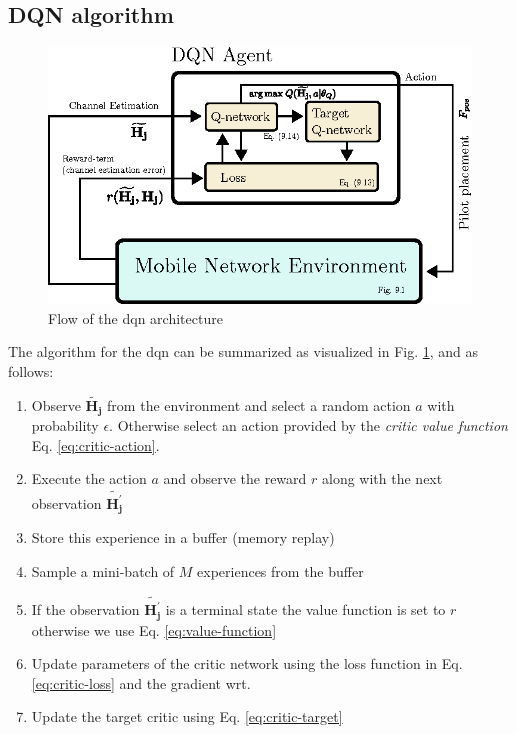 \subsection{DQN algorithm}\label{subsec:dqn_algorithm}
\begin{figure}
    \centering
    \includegraphics[width=\textwidth]{chapters/part_uplink/figures/RL_dqn_architecture_simplified.eps}
    \caption{Flow of the \gls{dqn} architecture}
    \label{fig:dqn_architecture_simplified}
\end{figure}

The algorithm for the \gls{dqn} can be summarized as visualized in Fig. \ref{fig:dqn_architecture_simplified}, and as follows: 


\begin{enumerate}
    \item Observe $\mathbf{\widetilde{H_j}}$ from the environment and select a random action $a$ with probability $\epsilon$. Otherwise select an action provided by the \emph{critic value function} Eq. \ref{eq:critic-action}.
    \item Execute the action $a$ and observe the reward $r$ along with the next observation $\mathbf{\widetilde{H_j^{'}}}$
    \item Store this experience in a buffer (memory replay)
    \item Sample a mini-batch of $M$ experiences from the buffer
    \item If the observation $\mathbf{\widetilde{H_j^{'}}}$ is a terminal state the value function is set to $r$ otherwise we use Eq. \ref{eq:value-function}
    \item Update parameters of the critic network using the loss function in Eq. \ref{eq:critic-loss} and the gradient wrt. 
    \item Update the target critic using Eq. \ref{eq:critic-target}
\end{enumerate}

